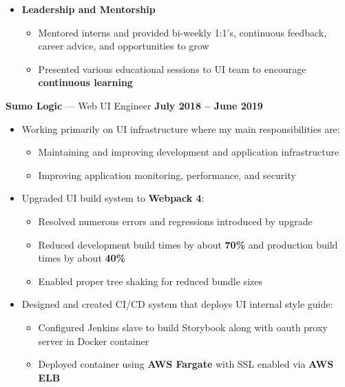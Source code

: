 \documentclass[10pt, oneside]{letter}
\begin{document}
\begin{adjustwidth}{0.1in}{0pt}
\begin{itemize}
\begin{itemize}
              \item \textbf{Leadership and Mentorship}
                \begin{itemize}
                  \item {
                      Mentored interns and provided bi-weekly 1:1's, continuous
                      feedback, career advice, and opportunities to grow
                  }
                  \item {
                      Presented various educational sessions to UI team to
                      encourage \textbf{continuous learning}
                  }
                \end{itemize}
            \end{itemize}
          \textbf{Sumo Logic} --- Web UI Engineer \hfill \textbf{July 2018 -- June 2019}
            \begin{itemize}
              \item {
                Working primarily on UI infrastructure where my main
                responsibilities are:
              }
                \begin{itemize}
                  \item {
                      Maintaining and improving development and application
                      infrastructure
                  }
                  \item {
                      Improving application monitoring, performance, and
                      security
                  }
                \end{itemize}
              \item Upgraded UI build system to \textbf{Webpack 4}:
                \begin{itemize}
                  \item {
                      Resolved numerous errors and regressions introduced by
                      upgrade
                  }
                  \item {
                      Reduced development build times by about \textbf{70\%}
                      and production build times by about \textbf{40\%}
                  }
                  \item Enabled proper tree shaking for reduced bundle sizes
                \end{itemize}

              \item {
                  Designed and created CI/CD system that deploys UI internal
                  style guide:
              }
                \begin{itemize}
                  \item {
                      Configured Jenkins slave to build Storybook along with
                      oauth proxy server in Docker container
                  }
                  \item {
                      Deployed container using \textbf{AWS Fargate} with SSL
                      enabled via \textbf{AWS ELB}
                  }
                \end{itemize}


\end{itemize}
\end{itemize}
\end{adjustwidth}
\end{document}
